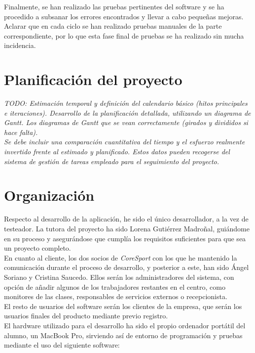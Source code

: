 Finalmente, se han realizado las pruebas pertinentes del software y se ha procedido a subsanar los errores encontrados y llevar a cabo pequeñas mejoras. Aclarar que en cada ciclo se han realizado pruebas manuales de la parte correspondiente, por lo que esta fase final de pruebas se ha realizado sin mucha incidencia.


\section{Planificación del proyecto}

\textit{TODO: Estimación temporal y definición del calendario básico (hitos principales e iteraciones). Desarrollo de la planificación detallada, utilizando un diagrama de Gantt. Los diagramas de Gantt que se vean correctamente (girados y divididos si hace falta).}\\

\textit{Se debe incluir una comparación cuantitativa del tiempo y el esfuerzo realmente invertido frente al estimado y planificado. Estos datos pueden recogerse del sistema de gestión de tareas empleado para el seguimiento del proyecto.}


\section{Organización}

Respecto al desarrollo de la aplicación, he sido el único desarrollador, a la vez de testeador. La tutora del proyecto ha sido Lorena Gutiérrez Madroñal, guiándome en su proceso y asegurándose que cumplía los requisitos suficientes para que sea un proyecto completo. 
\\

En cuanto al cliente, los dos socios de \textsl{CoreSport} con los que he mantenido la comunicación durante el proceso de desarrollo, y posterior a este, han sido Ángel Soriano y Cristina Saucedo. Ellos serán los administradores del sistema, con opción de añadir algunos de los trabajadores restantes en el centro, como monitores de las clases, responsables de servicios externos o recepcionista. 
\\

El resto de usuarios del software serán los clientes de la empresa, que serán los usuarios finales del producto mediante previo registro.
\\

El hardware utilizado para el desarrollo ha sido el propio ordenador portátil del alumno, un MacBook Pro, sirviendo así de entorno de programación y pruebas mediante el uso del siguiente software: 

